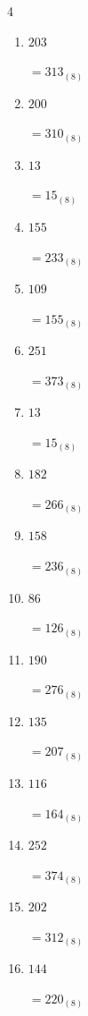 \begin{multicols}{4}
\begin{enumerate}
        $=255_{(8)}$

  \item $203$

        $=313_{(8)}$

  \item $200$

        $=310_{(8)}$

  \item $13$

        $=15_{(8)}$

  \item $155$

        $=233_{(8)}$

  \item $109$

        $=155_{(8)}$

  \item $251$

        $=373_{(8)}$

\columnbreak %

  \item $13$

        $=15_{(8)}$

  \item $182$

        $=266_{(8)}$

  \item $158$

        $=236_{(8)}$

  \item $86$

        $=126_{(8)}$

  \item $190$

        $=276_{(8)}$

  \item $135$

        $=207_{(8)}$

  \item $116$

        $=164_{(8)}$

  \item $252$

        $=374_{(8)}$

  \item $202$

        $=312_{(8)}$

  \item $144$

        $=220_{(8)}$


\end{enumerate}
\end{multicols}
